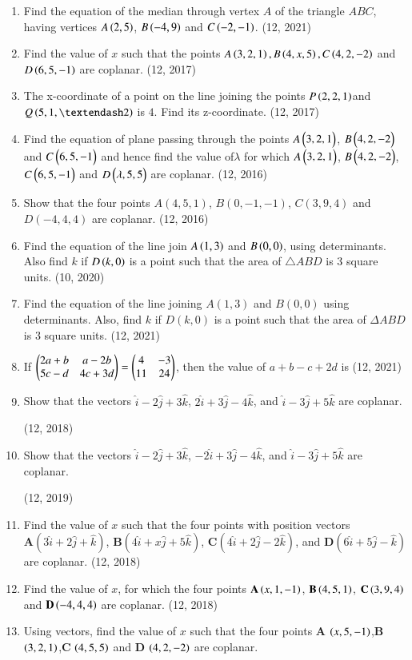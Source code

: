 \begin{enumerate}[label=\thesubsection.\arabic*, ref=\thesubsection.\theenumi]
\item Find the equation of the median through vertex $A$ of the triangle $ABC$, having vertices $A\left(2,5\right)$, $B\left(-4,9\right)$ and $C\left(-2, -1\right)$. \hfill (12, 2021)
\item Find the value of $x$ such that the points $A\left(3,2,1\right), B\left(4, x, 5\right), C\left(4,2,-2\right)$ and $D\left(6,5,-1\right)$ are coplanar. \hfill (12, 2017)
\item The x-coordinate of a point on the line joining the points $P\left(2, 2, 1\right)$and $Q\brak{5, 1,–2}$  is $4$. Find its z-coordinate. \hfill (12, 2017)
\item Find the equation of plane passing through the points $A\begin{pmatrix}3 , 2 , 1\end{pmatrix}$,
      $B\begin{pmatrix}4, 2, -2\end{pmatrix}$ and $C\begin{pmatrix}6, 5, -1\end{pmatrix}$ and hence find the value of$\lambda$ for which
      $A\begin{pmatrix}3, 2 , 1\end{pmatrix}$, $B\begin{pmatrix}4 , 2 , -2\end{pmatrix}$, $C\begin{pmatrix}6 , 5 , -1\end{pmatrix}$ and $D\begin{pmatrix}\lambda , 5 , 5\end{pmatrix}$
      are coplanar. \hfill (12, 2016)
\item Show that the four points $A(4,5,1)$, $ B(0,-1,-1)$,
      $C(3,9,4)$ and $D(-4,4,4)$ are coplanar. \hfill (12, 2016)
\item Find the equation of the line join $A\left(1, 3\right)$ and $B\left(0, 0\right)$, using determinants. Also find $k$ if $D\left(k,0\right)$ is a point such that the area of $\triangle ABD$ is $3$ square units.
\hfill (10, 2020)
    \item Find the equation of the line joining $A(1, 3)$ and $B(0, 0)$ using determinants. Also, find $k$ if $D(k, 0)$ is a point such that the area of $\Delta{ABD}$ is $3$ square units.
\hfill (12, 2021)
    \item If
    $\begin{pmatrix}2a+b & a-2b \\ 5c-d & 4c+3d\end{pmatrix} = \begin{pmatrix}4 & -3 \\ 11 & 24\end{pmatrix}$, then the value of $a + b - c + 2d$ is
\hfill (12, 2021)
\item Show that the vectors $\hat{i} - 2\hat{j} + 3\hat{k}$, $2\hat{i} + 3\hat{j} - 4\hat{k}$, and $\hat{i} - 3\hat{j} + 5\hat{k}$ are coplanar. 

	\hfill (12, 2018)
	\item Show that the vectors $\hat{i} - 2\hat{j} + 3\hat{k}$, $-2\hat{i} + 3\hat{j} - 4\hat{k}$, and $\hat{i} - 3\hat{j} + 5\hat{k}$ are coplanar.

		\hfill (12, 2019)
\item Find the value of $x$ such that the four points with position vectors $\mathbf{A}(3\hat{i} + 2\hat{j} + \hat{k})$, $\mathbf{B}(4\hat{i} + x\hat{j} + 5\hat{k})$, $\mathbf{C}(4\hat{i} + 2\hat{j} - 2\hat{k})$, and $\mathbf{D}(6\hat{i} + 5\hat{j} - \hat{k})$ are coplanar. \hfill (12, 2018)
\item Find the value of $x$, for which the four points $\mathbf{A}\left(x,1,-1\right)$, $\mathbf{B}\left(4,5,1\right)$, $\mathbf{C}\left(3,9,4\right)$ and $\mathbf{D}\left(-4,4,4\right)$ are coplanar.
\hfill (12, 2018)
\item Using vectors, find the value of $x$ such that the four points $\mathbf{A}$ $\left(x,5,-1\right)$,$\mathbf{B}$ $\left(3,2,1\right)$,$\mathbf{C}$ $\left(4,5,5\right)$ and $\mathbf{D}$ $\left(4,2,-2\right)$ are coplanar.


\end{enumerate}
